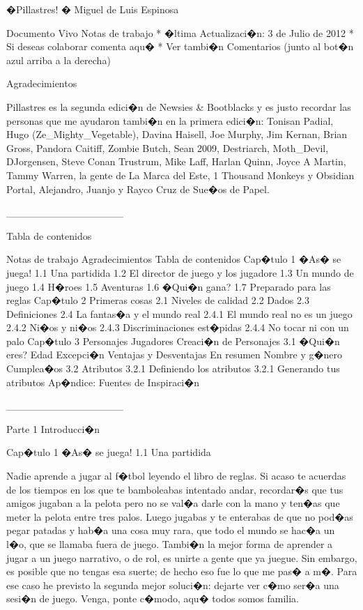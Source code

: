 �Pillastres!
� Miguel de Luis Espinosa


Documento Vivo
Notas de trabajo
* �ltima Actualizaci�n: 3 de Julio de 2012
* Si deseas colaborar comenta aqu�
* Ver tambi�n Comentarios (junto al bot�n azul arriba a la derecha)


Agradecimientos


Pillastres es la segunda edici�n de Newsies & Bootblacks y es justo recordar las personas que me ayudaron tambi�n en la primera edici�n: Tonisan Padial, Hugo (Ze_Mighty_Vegetable), Davina Haisell, Joe Murphy, Jim Kernan, Brian Gross, Pandora Caitiff, Zombie Butch, Sean 2009, Destriarch, Moth_Devil, DJorgensen, Steve Conan Trustrum, Mike Laff, Harlan Quinn, Joyce A Martin, Tammy Warren, la gente de La Marca del Este, 1 Thousand Monkeys y Obsidian Portal, Alejandro, Juanjo y Rayco Cruz de Sue�os de Papel.


________________


Tabla de contenidos


Notas de trabajo
Agradecimientos
Tabla de contenidos
Cap�tulo 1 �As� se juega!
1.1 Una partidida
1.2 El director de juego y los jugadore
1.3 Un mundo de juego
1.4 H�roes
1.5 Aventuras
1.6 �Qui�n gana?
1.7 Preparado para las reglas
Cap�tulo 2 Primeras cosas
2.1 Niveles de calidad
2.2 Dados
2.3 Definiciones
2.4 La fantas�a y el mundo real
2.4.1 El mundo real no es un juego
2.4.2 Ni�os y ni�os
2.4.3 Discriminaciones est�pidas
2.4.4 No tocar ni con un palo
Cap�tulo 3 Personajes Jugadores
Creaci�n de Personajes
3.1 �Qui�n eres?
Edad
Excepci�n
Ventajas y Desventajas
En resumen
Nombre y g�nero
Cumplea�os
3.2 Atributos
3.2.1 Definiendo los atributos
3.2.1 Generando tus atributos
Ap�ndice: Fuentes de Inspiraci�n








________________


Parte 1 Introducci�n


Cap�tulo 1 �As� se juega!
1.1 Una partidida


Nadie aprende a jugar al f�tbol leyendo el libro de reglas. Si acaso te acuerdas de los tiempos en los que te bamboleabas intentado andar, recordar�s que tus amigos jugaban a la pelota pero no se val�a darle con la mano y ten�as que meter la pelota entre tres palos. Luego jugabas y te enterabas de que no pod�as pegar patadas y hab�a una cosa muy rara, que todo el mundo se hac�a un l�o, que se llamaba fuera de juego.
Tambi�n la mejor forma de aprender a jugar a un juego narrativo, o de rol, es unirte a gente que ya juegue. Sin embargo, es posible que no tengas esa suerte; de hecho eso fue lo que me pas� a m�. Para ese caso he previsto la segunda mejor soluci�n: dejarte ver c�mo ser�a una sesi�n de juego. Venga, ponte c�modo, aqu� todos somos familia.


